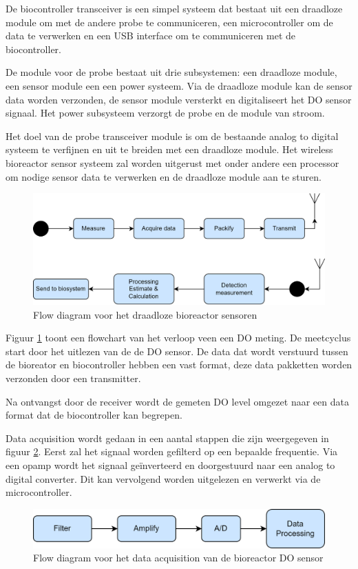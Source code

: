 De biocontroller transceiver is een simpel systeem dat bestaat uit een draadloze module om met de andere probe te communiceren, een microcontroller om de data te verwerken en een USB interface om te communiceren met de biocontroller. 

De module voor de probe bestaat uit drie subsystemen: een draadloze module, een sensor module een een power systeem. Via de draadloze module kan de sensor data worden verzonden, de sensor module versterkt en digitaliseert het DO sensor signaal. Het power subsysteem verzorgt de probe en de module van stroom. 

Het doel van de probe transceiver module is om de bestaande analog to digital systeem te verfijnen en uit te breiden met een draadloze module. Het wireless bioreactor sensor systeem zal worden uitgerust met onder andere een processor om nodige sensor data te verwerken en de draadloze module aan te sturen.  

\begin{figure}[H]
	\centering
	\includegraphics[width=0.60\linewidth]{graphics/probe_flow_simple}
	\caption{Flow diagram voor het draadloze bioreactor sensoren}
	\label{fig:probe_flow_simple}
\end{figure}

Figuur \ref{fig:probe_flow_simple} toont een flowchart van het verloop veen een DO meting. De meetcyclus start door het uitlezen van de de DO sensor. De data dat wordt verstuurd tussen de bioreator en biocontroller hebben een vast format, deze data pakketten worden verzonden door een transmitter. 

Na ontvangst door de receiver wordt de gemeten DO level omgezet naar een data format dat de biocontroller kan begrepen. 

Data acquisition wordt gedaan in een aantal stappen die zijn weergegeven in figuur \ref{fig:acq_flow}. Eerst zal het signaal worden gefilterd op een bepaalde frequentie. Via een opamp wordt het signaal geïnverteerd en doorgestuurd naar een analog to digital converter. Dit kan vervolgend worden uitgelezen en verwerkt via de microcontroller.  
\begin{figure}[H]
	\centering
	\includegraphics[width=0.55\linewidth]{graphics/acquisition_flow}
	\caption{Flow diagram voor het data acquisition van de bioreactor DO sensor}
	\label{fig:acq_flow}
\end{figure}


